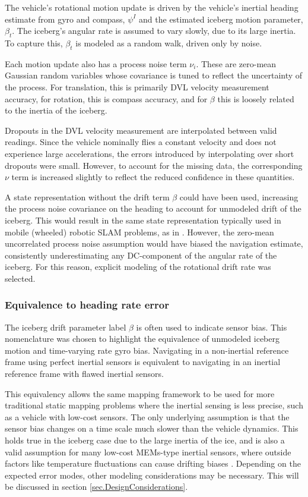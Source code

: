 The vehicle's rotational motion update is driven by the vehicle's inertial heading estimate from gyro and compass, $\psi^I$ and the estimated iceberg motion parameter, $\beta_t$.  The iceberg's angular rate is assumed to vary slowly, due to its large inertia. To capture this, $\beta_t$ is modeled as a random walk, driven only by noise.

Each motion update also has a process noise term $\nu_i$. These are zero-mean Gaussian random variables whose covariance is tuned to reflect the uncertainty of the process. For translation, this is primarily DVL velocity measurement accuracy, for rotation, this is compass accuracy, and for $\beta$ this is loosely related to the inertia of the iceberg. 

Dropouts in the DVL velocity measurement are interpolated between valid readings. Since the vehicle nominally flies a constant velocity and does not experience large accelerations, the errors introduced by interpolating over short dropouts were small. However, to account for the missing data, the corresponding $\nu$ term is increased slightly to reflect the reduced confidence in these quantities.

A state representation without the drift term $\beta$ could have been used, increasing the process noise covariance on the heading to account for unmodeled drift of the iceberg. This would result in the same state representation typically used in mobile (wheeled) robotic SLAM problems, as in \cite{Thrun2005}. However, the zero-mean uncorrelated process noise assumption would have biased the navigation estimate, consistently underestimating any DC-component of the angular rate of the iceberg. For this reason, explicit modeling of the rotational drift rate was selected.

\subsubsection{Equivalence to heading rate error}

The iceberg drift parameter label $\beta$ is often used to indicate sensor bias. This nomenclature was chosen to highlight the equivalence of unmodeled iceberg motion and time-varying rate gyro bias. Navigating in a non-inertial reference frame using perfect inertial sensors is equivalent to navigating in an inertial reference frame with flawed inertial sensors. 

This equivalency allows the same mapping framework to be used for more traditional static mapping problems where the inertial sensing is less precise, such as a vehicle with low-cost sensors. The only underlying assumption is that the sensor bias changes on a time scale much slower than the vehicle dynamics. This holds true in the iceberg case due to the large inertia of the ice, and is also a valid assumption for many low-cost MEMs-type inertial sensors, where outside factors like temperature fluctuations can cause drifting biases \cite{Keymeulen2005}. Depending on the expected error modes, other modeling considerations may be necessary. This will be discussed in section \ref{sec.DesignConsiderations}.


